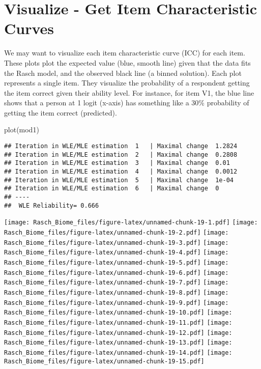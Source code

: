 \documentclass[
]{book}
\newenvironment{Shaded}{\begin{snugshade}}{\end{snugshade}}
\newcommand{\FunctionTok}[1]{\textcolor[rgb]{0.00,0.00,0.00}{#1}}
\newcommand{\NormalTok}[1]{#1}
\begin{document}
\hypertarget{visualize---get-item-characteristic-curves}{%
\section{Visualize - Get Item Characteristic Curves}\label{visualize---get-item-characteristic-curves}}

We may want to visualize each item characteristic curve (ICC) for each item. These plots plot the expected value (blue, smooth line) given that the data fits the Rasch model, and the observed black line (a binned solution). Each plot represents a single item. They visualize the probability of a respondent getting the item correct given their ability level. For instance, for item V1, the blue line shows that a person at 1 logit (x-axis) has something like a 30\% probability of getting the item correct (predicted).

\begin{Shaded}
\begin{Highlighting}[]
\FunctionTok{plot}\NormalTok{(mod1)}
\end{Highlighting}
\end{Shaded}

\begin{verbatim}
## Iteration in WLE/MLE estimation  1   | Maximal change  1.2824 
## Iteration in WLE/MLE estimation  2   | Maximal change  0.2808 
## Iteration in WLE/MLE estimation  3   | Maximal change  0.01 
## Iteration in WLE/MLE estimation  4   | Maximal change  0.0012 
## Iteration in WLE/MLE estimation  5   | Maximal change  1e-04 
## Iteration in WLE/MLE estimation  6   | Maximal change  0 
## ----
##  WLE Reliability= 0.666
\end{verbatim}

\texttt{[image: Rasch\_Biome\_files/figure-latex/unnamed-chunk-19-1.pdf]} \texttt{[image: Rasch\_Biome\_files/figure-latex/unnamed-chunk-19-2.pdf]} \texttt{[image: Rasch\_Biome\_files/figure-latex/unnamed-chunk-19-3.pdf]} \texttt{[image: Rasch\_Biome\_files/figure-latex/unnamed-chunk-19-4.pdf]} \texttt{[image: Rasch\_Biome\_files/figure-latex/unnamed-chunk-19-5.pdf]} \texttt{[image: Rasch\_Biome\_files/figure-latex/unnamed-chunk-19-6.pdf]} \texttt{[image: Rasch\_Biome\_files/figure-latex/unnamed-chunk-19-7.pdf]} \texttt{[image: Rasch\_Biome\_files/figure-latex/unnamed-chunk-19-8.pdf]} \texttt{[image: Rasch\_Biome\_files/figure-latex/unnamed-chunk-19-9.pdf]} \texttt{[image: Rasch\_Biome\_files/figure-latex/unnamed-chunk-19-10.pdf]} \texttt{[image: Rasch\_Biome\_files/figure-latex/unnamed-chunk-19-11.pdf]} \texttt{[image: Rasch\_Biome\_files/figure-latex/unnamed-chunk-19-12.pdf]} \texttt{[image: Rasch\_Biome\_files/figure-latex/unnamed-chunk-19-13.pdf]} \texttt{[image: Rasch\_Biome\_files/figure-latex/unnamed-chunk-19-14.pdf]} \texttt{[image: Rasch\_Biome\_files/figure-latex/unnamed-chunk-19-15.pdf]}
\end{document}
